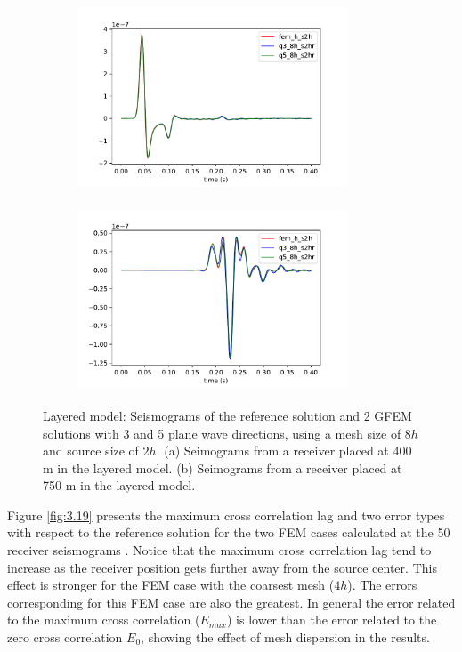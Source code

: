  \begin{figure}[h!]
 		\centering
		\begin{subfigure}{8cm}
				\includegraphics[width=8cm, height=5.5cm]{Thesis_Edith/figures/layered_model/layer_waves/gfemh_layered_tr1.pdf} 
			     \caption{}
		\end{subfigure}
        \hspace{0.25cm}	
		\begin{subfigure}{8cm}
				\includegraphics[width=8cm, height=5.5cm]{Thesis_Edith/figures/layered_model/layer_waves/gfemh_layered_tr50.pdf}
			   \caption{}
		\end{subfigure}
 
	\caption{Layered model: Seismograms of the reference solution and 2 GFEM solutions with 3 and 5 plane wave directions, using a mesh size of $8h$ and source size of $2h$. (a) Seimograms from a receiver placed at 400 m in the layered model. (b) Seimograms from a receiver placed at 750 m in the layered model.}
	\label{fig:3.18}
\end{figure}

\clearpage
 Figure \ref{fig:3.19} presents the maximum cross correlation lag and two error types with respect to the reference solution for the two FEM cases calculated at the 50 receiver seismograms . Notice that the maximum cross correlation lag tend to increase as the receiver position gets further away from the source center. This effect is stronger for the FEM case with the coarsest mesh ($4h$). The errors corresponding for this FEM case are also the greatest. In general the error related to the maximum cross correlation ($E_{max}$)  is lower than the error related to the zero cross correlation $E_0$, showing the effect of mesh dispersion in the results.
 
